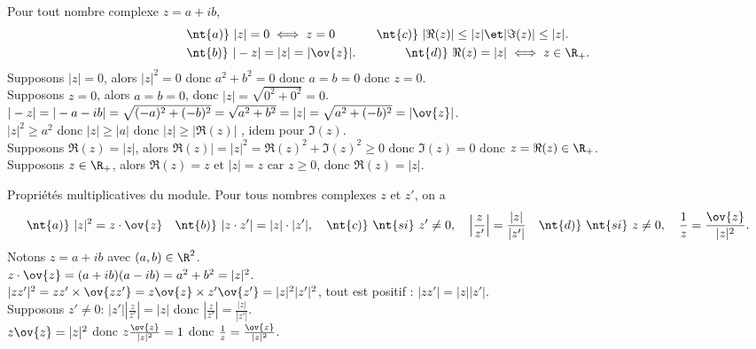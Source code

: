 \documentclass[11pt]{article}
\begin{document}
\begin{prop}{}{}
    Pour tout nombre complexe $z=a+ib$,
    \begin{align*}
        &\nt{a)}~|z|=0\iff z=0\qquad\quad~ \nt{c)}~|\Re(z)|\leq|z|\et|\Im(z)|\leq|z|.\\
        &\nt{b)}~|-z|=|z|=|\ov{z}|.\qquad\qquad \nt{d)}~\Re(z)=|z|\iff z\in\R_+.
    \end{align*}
    \tcblower
     Supposons $|z|=0$, alors $|z|^2=0$ donc $a^2+b^2=0$ donc $a=b=0$ donc $z=0$.\\
    Supposons $z=0$, alors $a=b=0$, donc $|z|=\sqrt{0^2+0^2}=0$.\\
     $|-z|=|-a-ib|=\sqrt{(-a)^2+(-b)^2}=\sqrt{a^2+b^2}=|z|=\sqrt{a^2+(-b)^2}=|\ov{z}|$.\\
     $|z|^2\geq a^2$ donc $|z|\geq|a|$ donc $|z|\geq|\Re(z)|$ , idem pour $\Im(z)$.\\
     Supposons $\Re(z)=|z|$, alors $\Re(z)|=|z|^2=\Re(z)^2+\Im(z)^2\geq0$ donc $\Im(z)=0$ donc $z=\Re(z)\in\R_+$.\\
    Supposons $z\in\R_+$, alors $\Re(z)=z$ et $|z|=z$ car $z\geq0$, donc $\Re(z)=|z|$.
\end{prop}

\begin{prop}{Propriétés multiplicatives du module.}{}
    Pour tous nombres complexes $z$ et $z'$, on a
    \begin{equation*}
        \nt{a)}~|z|^2=z\cdot\ov{z}\quad\nt{b)}~|z\cdot z'|=|z|\cdot|z'|,\quad\nt{c)}~\nt{si}~z'\neq0,\quad\left|\frac{z}{z'}\right|=\frac{|z|}{|z'|}\quad\nt{d)}~\nt{si}~z\neq0,\quad\frac{1}{z}=\frac{\ov{z}}{|z|^2}.
    \end{equation*}
    \tcblower
    Notons $z=a+ib$ avec $(a,b)\in\R^2$.\\
     $z\cdot\ov{z}=(a+ib)(a-ib)=a^2+b^2=|z|^2$.\\
     $|zz'|^2=zz'\times \ov{zz'}=z\ov{z}\times z'\ov{z'}=|z|^2|z'|^2$, tout est positif : $|zz'|=|z||z'|$.\\
     Supposons $z'\neq0$: $|z'|\left|\frac{z}{z'}\right|=|z|$ donc $\left|\frac{z}{z'}\right|=\frac{|z|}{|z'|}$.\\
     $z\ov{z}=|z|^2$ donc $z\frac{\ov{z}}{|z|^2}=1$ donc $\frac{1}{z}=\frac{\ov{z}}{|z|^2}$.
\end{prop}
\end{document}
